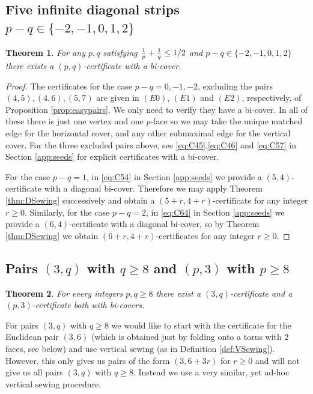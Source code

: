 \documentclass[11pt]{article}
\newtheorem{theorem}{Theorem}[section]
\theoremstyle{remark}
\begin{document}
\subsection{Five infinite diagonal strips $p-q\in\{-2,-1,0,1,2\}$}
\begin{theorem}\label{thm:5strips} For any $p,q$ satisfying ${1 \over p}+{1 \over q} \leq 1/2$ and $p-q\in \{-2,-1,0,1,2\}$ there exists a $(p,q)$-certificate with a bi-cover.
\end{theorem}
\begin{proof}
The certificates for the case $p-q=0,-1,-2$, excluding the pairs $(4,5), (4,6), (5,7)$ are given in $(E0)$, $(E1)$ and $(E2)$, respectively, of Proposition \ref{prop:easypairs}. We only need to verify they have a bi-cover. In all of these there is just one vertex and one $p$-face so we may take the unique matched edge for the horizontal cover, and any other submaximal edge for the vertical cover. For the three excluded pairs above, see \eqref{eq:C45},\eqref{eq:C46} and \eqref{eq:C57} in Section \ref{app:seeds} for explicit certificates with a bi-cover. 

For the case $p-q=1$, in \eqref{eq:C54} in Section \ref{app:seeds} we provide a $(5,4)$-certificate with a diagonal bi-cover. Therefore we may apply Theorem \ref{thm:DSewing} successively and obtain a $(5+r,4+r)$-certificate for any integer $r\geq 0$. Similarly, for the case $p-q=2$, in \eqref{eq:C64} in Section \ref{app:seeds} we provide a $(6,4)$-certificate with a diagonal bi-cover, so by Theorem \ref{thm:DSewing} we obtain $(6+r,4+r)$-certificates for any integer $r\geq 0$. 
\end{proof}

\subsection{Pairs $(3,q)$ with $q \geq 8$ and $(p,3)$ with $p\geq 8$}

\begin{theorem}\label{thm:3qp3} For every integers $p,q\geq 8$ there exist a $(3,q)$-certificate and a $(p,3)$-certificate both with bi-covers. 
\end{theorem}

For pairs $(3,q)$ with $q\geq 8$ we would like to start with the certificate for the Euclidean pair $(3,6)$ (which is obtained just by folding onto a torus with $2$ faces, see below) and use vertical sewing (as in Definition \ref{def:VSewing}). However, this only gives us pairs of the form $(3,6+3r)$ for $r \geq 0$ and will not give us all pairs $(3,q)$ with $q \geq 8$. Instead we use a very similar, yet ad-hoc vertical sewing procedure. 
\end{document}
